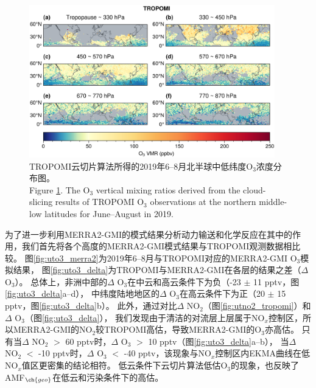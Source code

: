 \begin{figure}[H]
    \centering
    \includegraphics[width=0.95\textwidth]{./figures/uto3_tropomi.png}
    \caption{
    TROPOMI云切片算法所得的2019年6--8月北半球中低纬度O$_3$浓度分布图。 \\
    Figure \ref{fig:uto3_tropomi}. The O$_3$ vertical mixing ratios derived from the cloud-slicing results of TROPOMI O$_3$ observations at the northern middle-low latitudes for June--August in 2019.
    }
    \label{fig:uto3_tropomi}
\end{figure}

为了进一步利用MERRA2-GMI的模式结果分析动力输送和化学反应在其中的作用，我们首先将各个高度的MERRA2-GMI模式结果与TROPOMI观测数据相比较。
图\ref{fig:uto3_merra2}为2019年6--8月与TROPOMI对应的MERRA2-GMI O$_3$模拟结果，
图\ref{fig:uto3_delta}为TROPOMI与MERRA2-GMI在各层的结果之差（$\Delta$ O$_3$）。
总体上，非洲中部的$\Delta$ O$_3$在中云和高云条件下为负（-23 $\pm$ 11 pptv，图\ref{fig:uto3_delta}a--d），
中纬度陆地地区的$\Delta$ O$_3$在高云条件下为正（20 $\pm$ 15 pptv，图\ref{fig:uto3_delta}b）。
此外，通过对比$\Delta$ NO$_2$（图\ref{fig:utno2_tropomi}）和$\Delta$ O$_3$（图\ref{fig:uto3_delta}），
我们发现由于清洁的对流层上层属于NO$_x$控制区\citep{Brown.2022}，所以MERRA2-GMI的NO$_2$较TROPOMI高估，导致MERRA2-GMI的O$_3$亦高估。
只有当$\Delta$ NO$_2$ $>$ 60 pptv时，$\Delta$ O$_3$ $>$ 10 pptv（图\ref{fig:uto3_delta}a--b），
当$\Delta$ NO$_2$ $<$ -10 pptv时，$\Delta$ O$_3$ $<$ -40 pptv，该现象与NO$_x$控制区内EKMA曲线在低NO$_x$值区更密集的结论相符。
低云条件下云切片算法低估O$_3$的现象，也反映了AMF$_{\ch{geo}}$在低云和污染条件下的高估\citep{BelmonteRivas.2015}。


